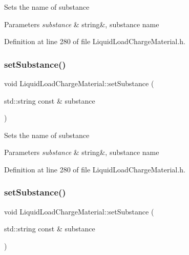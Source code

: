 Sets the name of substance 
\begin{DoxyParams}{Parameters}
{\em substance} & string\&, substance name \\
\hline
\end{DoxyParams}


Definition at line 280 of file Liquid\+Load\+Charge\+Material.\+h.

\mbox{\label{class_liquid_load_charge_material_a85bb43270c6a11a1eaf51f00da16746a}} 
\subsubsection{\texorpdfstring{set\+Substance()}{setSubstance()}\hspace{0.1cm}{\footnotesize\ttfamily [2/3]}}
{\footnotesize\ttfamily void Liquid\+Load\+Charge\+Material\+::set\+Substance (\begin{DoxyParamCaption}\item[{std\+::string const \&}]{substance }\end{DoxyParamCaption})\hspace{0.3cm}{\ttfamily [inline]}}

Sets the name of substance 
\begin{DoxyParams}{Parameters}
{\em substance} & string\&, substance name \\
\hline
\end{DoxyParams}


Definition at line 280 of file Liquid\+Load\+Charge\+Material.\+h.

\mbox{\label{class_liquid_load_charge_material_a85bb43270c6a11a1eaf51f00da16746a}} 
\subsubsection{\texorpdfstring{set\+Substance()}{setSubstance()}\hspace{0.1cm}{\footnotesize\ttfamily [3/3]}}
{\footnotesize\ttfamily void Liquid\+Load\+Charge\+Material\+::set\+Substance (\begin{DoxyParamCaption}\item[{std\+::string const \&}]{substance }\end{DoxyParamCaption})\hspace{0.3cm}{\ttfamily [inline]}}

